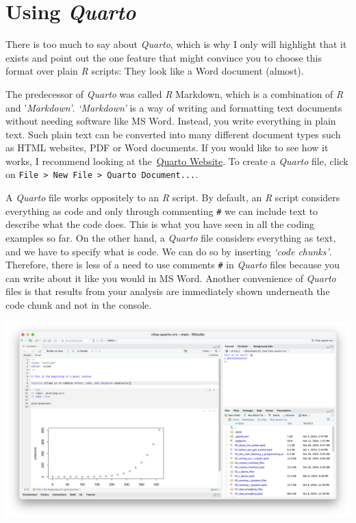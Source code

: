\documentclass[
  letterpaper,
  DIV=11,
  numbers=noendperiod]{scrreprt}
\begin{document}
\section{\texorpdfstring{Using
\emph{Quarto}}{Using Quarto}}\label{sec-r-markdown-and-r-notebooks}

There is too much to say about \emph{Quarto}, which is why I only will
highlight that it exists and point out the one feature that might
convince you to choose this format over plain \emph{R} scripts: They
look like a Word document (almost).

The predecessor of \emph{Quarto} was called \emph{R} Markdown, which is
a combination of \emph{R} and '\emph{Markdown'}. \emph{`Markdown'} is a
way of writing and formatting text documents without needing software
like MS Word. Instead, you write everything in plain text. Such plain
text can be converted into many different document types such as HTML
websites, PDF or Word documents. If you would like to see how it works,
I recommend looking at the~\hyperref[0]{Quarto Website}. To create a
\emph{Quarto} file, click on
\texttt{File\ \textgreater{}\ New\ File\ \textgreater{}\ Quarto\ Document...}.

A \emph{Quarto} file works oppositely to an \emph{R} script. By default,
an \emph{R} script considers everything as code and only through
commenting \texttt{\#} we can include text to describe what the code
does. This is what you have seen in all the coding examples so far. On
the other hand, a \emph{Quarto} file considers everything as text, and
we have to specify what is code. We can do so by inserting \emph{`code
chunks'}. Therefore, there is less of a need to use comments \texttt{\#}
in \emph{Quarto} files because you can write about it like you would in
MS Word. Another convenience of \emph{Quarto} files is that results from
your analysis are immediately shown underneath the code chunk and not in
the console.

\includegraphics{images/chapter_06_img/03_r_markdown/01_quarto_plain.png}
\end{document}
